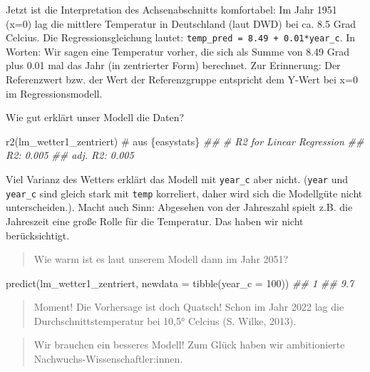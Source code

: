 \documentclass[
  letterpaper,
]{scrbook}
\newenvironment{Shaded}{\begin{snugshade}}{\end{snugshade}}
\newcommand{\AttributeTok}[1]{\textcolor[rgb]{0.40,0.45,0.13}{#1}}
\newcommand{\CommentTok}[1]{\textcolor[rgb]{0.37,0.37,0.37}{#1}}
\newcommand{\DecValTok}[1]{\textcolor[rgb]{0.68,0.00,0.00}{#1}}
\newcommand{\DocumentationTok}[1]{\textcolor[rgb]{0.37,0.37,0.37}{\textit{#1}}}
\newcommand{\FunctionTok}[1]{\textcolor[rgb]{0.28,0.35,0.67}{#1}}
\newcommand{\NormalTok}[1]{\textcolor[rgb]{0.00,0.23,0.31}{#1}}
\theoremstyle{definition}
\theoremstyle{definition}
\theoremstyle{definition}
\theoremstyle{remark}
\begin{document}
Jetzt ist die Interpretation des Achsenabschnitts komfortabel: Im Jahr
1951 (x=0) lag die mittlere Temperatur in Deutschland (laut DWD) bei ca.
8.5 Grad Celcius. Die Regressionsgleichung lautet:
\texttt{temp\_pred\ =\ 8.49\ +\ 0.01*year\_c}. In Worten: Wir sagen eine
Temperatur vorher, die sich als Summe von 8.49 Grad plus 0.01 mal das
Jahr (in zentrierter Form) berechnet. Zur Erinnerung: Der Referenzwert
bzw. der Wert der Referenzgruppe entspricht dem Y-Wert bei x=0 im
Regressionsmodell.

Wie gut erklärt unser Modell die Daten?

\begin{Shaded}
\begin{Highlighting}[]
\FunctionTok{r2}\NormalTok{(lm\_wetter1\_zentriert)  }\CommentTok{\# aus \textasciigrave{}\{easystats\}\textasciigrave{}}
\DocumentationTok{\#\# \# R2 for Linear Regression}
\DocumentationTok{\#\#        R2: 0.005}
\DocumentationTok{\#\#   adj. R2: 0.005}
\end{Highlighting}
\end{Shaded}

Viel Varianz des Wetters erklärt das Modell mit \texttt{year\_c} aber
nicht. (\texttt{year} und \texttt{year\_c} sind gleich stark mit
\texttt{temp} korreliert, daher wird sich die Modellgüte nicht
unterscheiden.). Macht auch Sinn: Abgesehen von der Jahreszahl spielt
z.B. die Jahreszeit eine große Rolle für die Temperatur. Das haben wir
nicht berücksichtigt.

\begin{quote}
{} Wie warm ist es laut unserem Modell dann im Jahr 2051?
\end{quote}

\begin{Shaded}
\begin{Highlighting}[]
\FunctionTok{predict}\NormalTok{(lm\_wetter1\_zentriert, }\AttributeTok{newdata =} \FunctionTok{tibble}\NormalTok{(}\AttributeTok{year\_c =} \DecValTok{100}\NormalTok{))}
\DocumentationTok{\#\#   1 }
\DocumentationTok{\#\# 9.7}
\end{Highlighting}
\end{Shaded}

\begin{quote}
{} Moment! Die Vorhersage ist doch Quatsch! Schon im Jahr
2022 lag die Durchschnittstemperatur bei 10,5° Celcius (S. Wilke, 2013).
\end{quote}

\begin{quote}
{} Wir brauchen ein besseres Modell! Zum Glück haben wir
ambitionierte Nachwuchs-Wissenschaftler:innen.
\end{quote}
\end{document}
